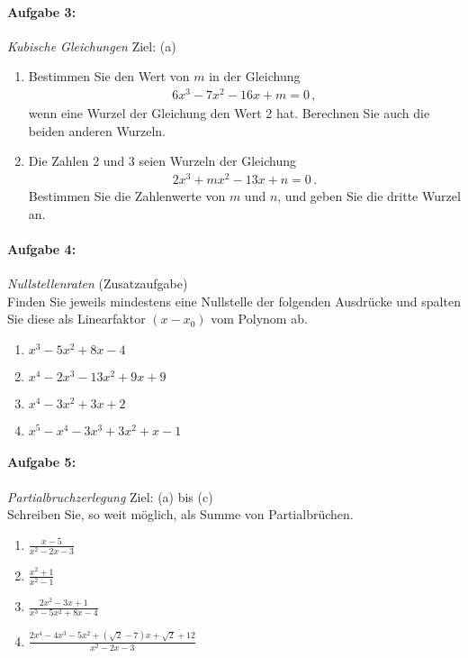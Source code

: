\paragraph{Aufgabe 3: } \emph{Kubische Gleichungen} \hfill Ziel: (a)\\[-4mm]
\begin{enumerate}[label=(\alph*)]
    \item Bestimmen Sie den Wert von $m$ in der Gleichung
    \begin{align*}
    6x^3-7x^2-16x+m=0\,,
    \end{align*}
    wenn eine Wurzel der Gleichung den Wert 2 hat. Berechnen Sie auch die beiden anderen Wurzeln.
    \item Die Zahlen 2 und 3 seien Wurzeln der Gleichung
    \begin{align*}
    2x^3+mx^2-13x+n=0\,.
    \end{align*}
    Bestimmen Sie die Zahlenwerte von $m$ und $n$, und geben Sie die dritte Wurzel an.
\end{enumerate}

\newpage
\paragraph{Aufgabe 4: } \emph{Nullstellenraten} \hfill (Zusatzaufgabe)\\[0.2cm]
Finden Sie jeweils mindestens eine Nullstelle der folgenden Ausdrücke und spalten Sie diese als Linearfaktor $(x-x_0)$ vom Polynom ab.
\begin{multicols}{2}
    \begin{enumerate}[label=(\alph*), labelindent=1em,labelsep=0.5cm]
        \item $x^3-5x^2+8x-4$
        \item $x^4-2x^3-13x^2+9x+9$
        \item $x^4-3x^2+3x+2$
        \item $x^5-x^4-3x^3+3x^2+x-1$
    \end{enumerate}
\end{multicols}
%
\paragraph{Aufgabe 5: } \emph{Partialbruchzerlegung} \hfill Ziel: (a) bis (c)\\[0.2cm]
Schreiben Sie, so weit möglich, als Summe von Partialbrüchen.
\begin{multicols}{2}
    \begin{enumerate}[label=(\alph*)]
        \item $\frac{x-5}{x^2-2x-3}$
        \item $\frac{x^2+1}{x^2-1}$
        \item $\frac{2x^2-3x+1}{x^3-5x^2+8x-4}$
        \item $\frac{2x^4-4x^3-5x^2+(\sqrt{2}-7)x+\sqrt{2}+12}{x^2-2x-3}$
    \end{enumerate}
\end{multicols}
%

